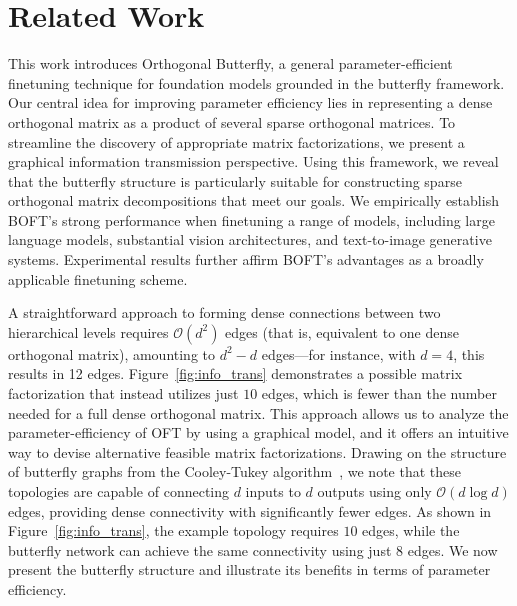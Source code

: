 \section{Related Work}

This work introduces Orthogonal Butterfly, a general parameter-efficient finetuning technique for foundation models grounded in the butterfly framework. Our central idea for improving parameter efficiency lies in representing a dense orthogonal matrix as a product of several sparse orthogonal matrices. To streamline the discovery of appropriate matrix factorizations, we present a graphical information transmission perspective. Using this framework, we reveal that the butterfly structure is particularly suitable for constructing sparse orthogonal matrix decompositions that meet our goals. We empirically establish BOFT's strong performance when finetuning a range of models, including large language models, substantial vision architectures, and text-to-image generative systems. Experimental results further affirm BOFT's advantages as a broadly applicable finetuning scheme.

A straightforward approach to forming dense connections between two hierarchical levels requires $\mathcal{O}(d^2)$ edges (that is, equivalent to one dense orthogonal matrix), amounting to $d^2-d$ edges—for instance, with $d=4$, this results in 12 edges. Figure~\ref{fig:info_trans} demonstrates a possible matrix factorization that instead utilizes just $10$ edges, which is fewer than the number needed for a full dense orthogonal matrix. This approach allows us to analyze the parameter-efficiency of OFT by using a graphical model, and it offers an intuitive way to devise alternative feasible matrix factorizations. Drawing on the structure of butterfly graphs from the Cooley-Tukey algorithm~\cite{cooley1965algorithm}, we note that these topologies are capable of connecting $d$ inputs to $d$ outputs using only $\mathcal{O}(d\log d)$ edges, providing dense connectivity with significantly fewer edges. As shown in Figure~\ref{fig:info_trans}, the example topology requires $10$ edges, while the butterfly network can achieve the same connectivity using just $8$ edges. We now present the butterfly structure and illustrate its benefits in terms of parameter efficiency.